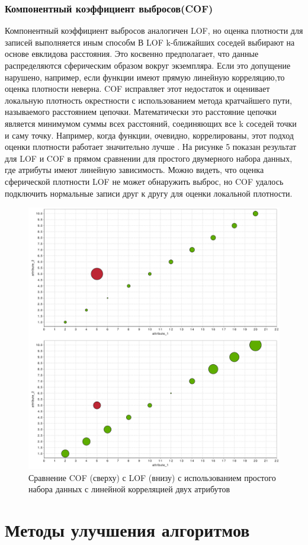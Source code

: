 \subsubsection{Компонентный коэффициент выбросов(COF)}
Компонентный коэффициент выбросов аналогичен LOF, но оценка плотности для записей выполняется иным способм В LOF k-ближайших соседей выбирают на основе евклидова расстояния. Это косвенно предполагает, что данные распределяются сферическим образом вокруг экземпляра. Если это допущение нарушено, например, если функции имеют прямую линейную корреляцию,то оценка плотности неверна. COF исправляет этот недостаток и оценивает локальную плотность окрестности с использованием метода кратчайшего пути, называемого расстоянием цепочки. Математически это расстояние цепочки является минимумом суммы всех расстояний, соединяющих все k соседей точки и саму точку. Например, когда функции, очевидно, коррелированы, этот подход оценки плотности работает значительно лучше \cite{Book14}. 
На рисунке 5 показан результат для LOF и COF в прямом сравнении для простого двумерного набора данных, где атрибуты имеют линейную зависимость. Можно видеть, что оценка сферической плотности LOF не может обнаружить выброс, но COF удалось подключить нормальные записи друг к другу для оценки локальной плотности.
\begin{figure}
	\centering
	\includegraphics[width=.5\textwidth]{img/5_3rdpart.png}
	\caption{Сравнение COF (сверху) с LOF (внизу) с использованием простого набора данных с линейной корреляцией двух атрибутов}
	\label{fig05}
\end{figure}
\section{Методы улучшения алгоритмов}
